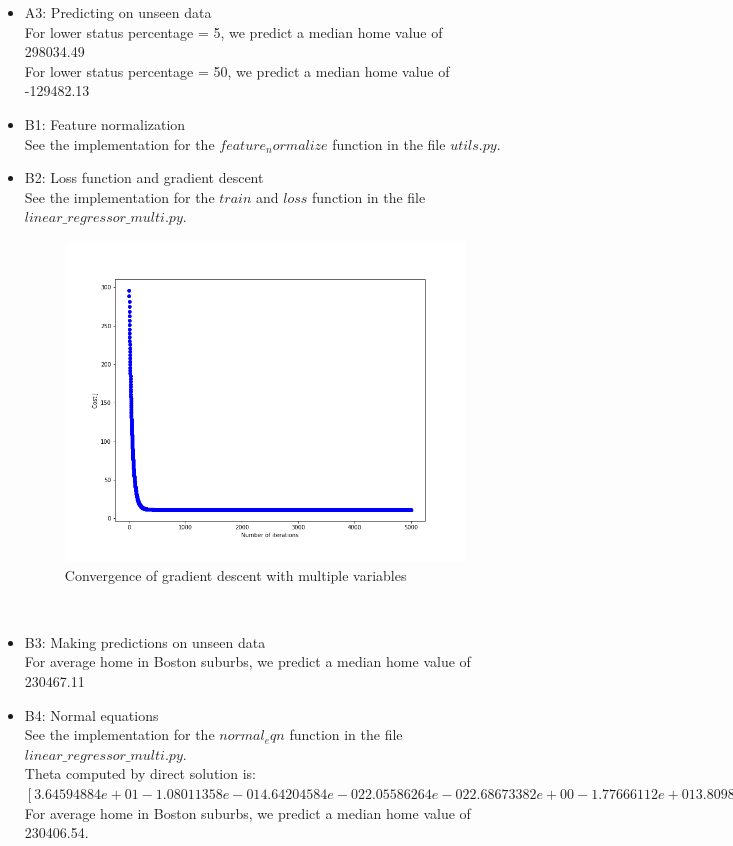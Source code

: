 \documentclass{article}
\begin{document}
\begin{itemize}
\begin{figure}[htbp]
	\caption{Convergence of gradient descent}
\end{figure}
    \item A3: Predicting on unseen data\\
    For lower status percentage = 5, we predict a median home value of 298034.49\\
For lower status percentage = 50, we predict a median home value of -129482.13\\
\item B1: Feature normalization\\
See the implementation for the $feature_normalize$ function in the file $utils.py$.
\item B2: Loss function and gradient descent\\
See the implementation for the $train$ and $loss$ function in the file $linear\_regressor\_multi.py$.
\begin{figure}[htbp]
	\centering
	\includegraphics[scale = 0.3]{multi_gradient_descent.png}
	\caption{Convergence of gradient descent with multiple variables}
\end{figure}\\
\item B3: Making predictions on unseen data\\
For average home in Boston suburbs, we predict a median home value of 230467.11\\
\item B4: Normal equations\\
See the implementation for the $normal_eqn$ function in the file $linear\_regressor\_multi.py$.\\
Theta computed by direct solution is: $[ 3.64594884e+01 -1.08011358e-01  4.64204584e-02  2.05586264e-02
  2.68673382e+00 -1.77666112e+01  3.80986521e+00  6.92224640e-04
 -1.47556685e+00  3.06049479e-01 -1.23345939e-02 -9.52747232e-01
  9.31168327e-03 -5.24758378e-01]$\\
For average home in Boston suburbs, we predict a median home value of 230406.54.\\


\end{itemize}
\end{document}
